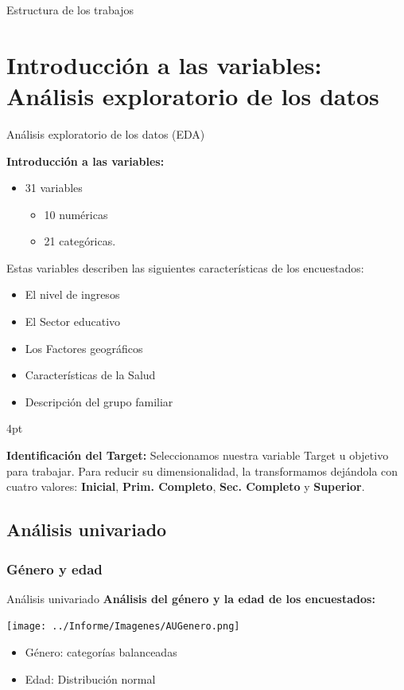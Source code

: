 \documentclass[pdf]{beamer}
\def\vspace{}%
\begin{document}
{\begin{frame}{Estructura de los trabajos}
\begin{enumerate}
    \end{enumerate}
\end{frame}

\section{Introducción a las variables: Análisis exploratorio de los datos}

\begin{frame}{Análisis exploratorio de los datos (EDA)}

    \textbf{Introducción a las variables:}
    \begin{itemize} 
        \item 31 variables
        \begin{itemize} 
            \item 10 numéricas 
            \item 21 categóricas. 
        \end{itemize}
    \end{itemize}
    Estas variables describen las siguientes características de los encuestados:
    \begin{itemize} 
        \item El nivel de ingresos
        \item El Sector educativo
        \item Los Factores geográficos
        \item Características de la Salud
        \item Descripción del grupo familiar
    \end{itemize}
    \vspace{4pt}

    \textbf{Identificación del Target:} Seleccionamos nuestra variable Target u objetivo para trabajar. Para reducir su dimensionalidad, la transformamos dejándola con cuatro valores:  \textbf{Inicial}, \textbf{Prim. Completo}, \textbf{Sec. Completo} y \textbf{Superior}.

\end{frame}
 
\subsection{Análisis univariado}
    \subsubsection{Género y edad}
\begin{frame}{Análisis univariado}
    \textbf{Análisis del género y la edad de los encuestados:}  
    \begin{center}
        \texttt{[image: ../Informe/Imagenes/AUGenero.png]}
    \end{center}
    \begin{itemize}
        \item Género: categorías balanceadas
        \item Edad: Distribución normal
    \end{itemize}
\end{frame}
              
}
\end{document}
